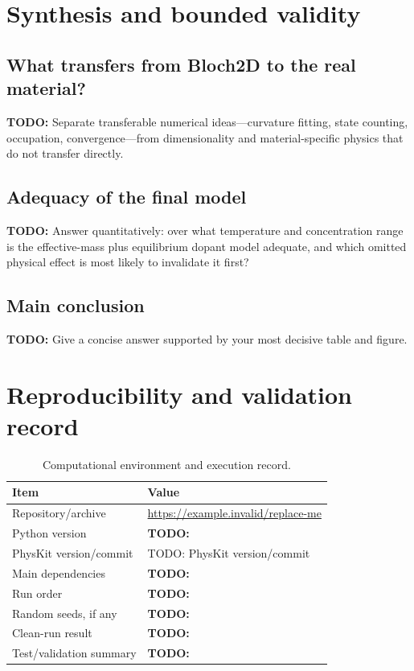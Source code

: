 \documentclass[11pt,a4paper]{article}
\newcommand{\repositoryurl}{https://example.invalid/replace-me}
\newcommand{\physkitversion}{TODO: PhysKit version/commit}
\newcommand{\todo}[1]{\textcolor{BrickRed}{\textbf{TODO:} #1}}
\begin{document}
\section{Synthesis and bounded validity}
\label{sec:synthesis}

\subsection{What transfers from Bloch2D to the real material?}

\todo{Separate transferable numerical ideas---curvature fitting, state counting,
occupation, convergence---from dimensionality and material-specific physics
that do not transfer directly.}

\subsection{Adequacy of the final model}

\todo{Answer quantitatively: over what temperature and concentration range is
the effective-mass plus equilibrium dopant model adequate, and which omitted
physical effect is most likely to invalidate it first?}

\subsection{Main conclusion}

\todo{Give a concise answer supported by your most decisive table and figure.}

\section{Reproducibility and validation record}
\label{sec:reproducibility}

\begin{table}[htbp]
  \centering
  \caption{Computational environment and execution record.}
  \label{tab:environment}
  \begin{tabularx}{\textwidth}{@{}p{}X@{}}
    \toprule
    Item & Value \\
    \midrule
    Repository/archive & \url{\repositoryurl} \\
    Python version & \todo{ } \\
    PhysKit version/commit & \physkitversion \\
    Main dependencies & \todo{ } \\
    Run order & \todo{ } \\
    Random seeds, if any & \todo{ } \\
    Clean-run result & \todo{ } \\
    Test/validation summary & \todo{ } \\
    \bottomrule
  \end{tabularx}
\end{table}
\end{document}
